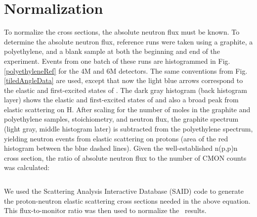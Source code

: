\section{Normalization}
To normalize the cross sections, the absolute neutron flux must be known.
To determine the absolute neutron flux, reference runs were taken using a graphite,
a polyethylene, and a blank sample at both the beginning and end of the experiment.
Events from one batch of these runs are
histogrammed in Fig. \ref{polyethyleneRef} for the 4M and 6M detectors.
The same conventions from Fig.
\ref{tiledAngleData} are used, except that now the light blue arrows correspond to
the elastic and first-excited states of \cTwelve. The dark gray histogram (back
histogram layer) shows the elastic and first-excited states of \cTwelve
and also a broad peak from elastic scattering on H. After scaling for the number
of moles in the graphite and polyethylene samples, stoichiometry, and neutron
flux, the graphite spectrum (light gray, middle histogram later) is subtracted from the polyethylene
spectrum, yielding neutron events from elastic scattering on protons (area of
the red histogram between the blue dashed lines). Given the
well-established n(p,p)n cross section, the ratio of absolute neutron flux to
the number of CMON counts was calculated:

\begin{equation}
    [insert monitor scaling equation]
\end{equation}

\noindent
We used the Scattering Analysis Interactive Database (SAID) code \cite{SAIDCode}
to generate
the proton-neutron elastic scattering cross sections needed in the above
equation. This flux-to-monitor ratio was then used to normalize the \snTwelveFour\
results.

